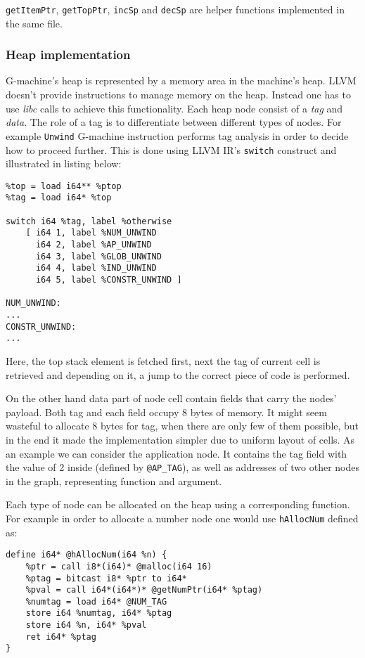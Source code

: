 \documentclass[12pt,a4paper]{report}
\begin{document}
\texttt{getItemPtr}, \texttt{getTopPtr}, \texttt{incSp} and \texttt{decSp} are
helper functions implemented in the same file.


\subsubsection{Heap implementation}
G-machine's heap is represented by a memory area in the machine's heap. LLVM
doesn't provide instructions to manage memory on the heap. Instead one has to
use \textit{libc} calls to achieve this functionality. Each heap node consist
of a \textit{tag} and \textit{data}. The role of a tag is to differentiate
between different types of nodes. For example \texttt{Unwind} G-machine
instruction performs tag analysis in order to decide how to proceed further.
This is done using LLVM IR's \texttt{switch} construct and illustrated in
listing below:

\hspace*{-1.5in}
\begin{lstlisting}[style=assembler]
%ptop = call i64**()* @getTopPtr()
%top = load i64** %ptop
%tag = load i64* %top

switch i64 %tag, label %otherwise
    [ i64 1, label %NUM_UNWIND
      i64 2, label %AP_UNWIND
      i64 3, label %GLOB_UNWIND
      i64 4, label %IND_UNWIND
      i64 5, label %CONSTR_UNWIND ]

NUM_UNWIND:
...
CONSTR_UNWIND:
...
\end{lstlisting}
Here, the top stack element is fetched first, next the tag of current cell is
retrieved and depending on it, a jump to the correct piece of code is
performed.

On the other hand data part of node cell contain fields that carry the nodes'
payload. Both tag and each field occupy 8 bytes of memory. It might seem
wasteful to allocate 8 bytes for tag, when there are only few of them possible,
but in the end it made the implementation simpler due to uniform layout of
cells. As an example we can consider the application node. It contains the tag
field with the value of 2 inside (defined by \texttt{@AP\_TAG}), as well as
addresses of two other nodes in the graph, representing function and argument.

Each type of node can be allocated on the heap using a corresponding function.
For example in order to allocate a number node one would use \texttt{hAllocNum}
defined as:

\hspace*{-1.5in}
\begin{lstlisting}[style=assembler,caption={Definition of function allocating number node on
  the heap.}]
define i64* @hAllocNum(i64 %n) {
    %ptr = call i8*(i64)* @malloc(i64 16)
    %ptag = bitcast i8* %ptr to i64*
    %pval = call i64*(i64*)* @getNumPtr(i64* %ptag)
    %numtag = load i64* @NUM_TAG
    store i64 %numtag, i64* %ptag
    store i64 %n, i64* %pval
    ret i64* %ptag
}
\end{lstlisting}
\end{document}
